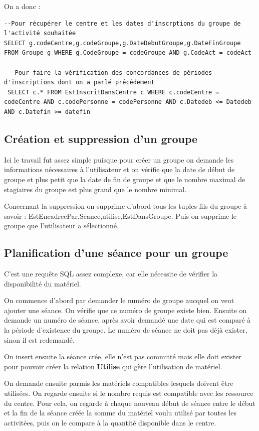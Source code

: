 \documentclass[10pt]{article}
\begin{document}
On a donc : 

 \begin{small}
\begin{verbatim}
--Pour récupérer le centre et les dates d'inscrptions du groupe de l'activité souhaitée
SELECT g.codeCentre,g.codeGroupe,g.DateDebutGroupe,g.DateFinGroupe FROM Groupe g WHERE g.CodeGroupe = codeGroupe AND g.CodeAct = codeAct

 --Pour faire la vérification des concordances de périodes d'inscriptions dont on a parlé précédement
 SELECT c.* FROM EstInscritDansCentre c WHERE c.codeCentre = codeCentre AND c.codePersonne = codePersonne AND c.Datedeb <= Datedeb AND c.Datefin >= datefin
\end{verbatim}
\end{small}

\subsection{Création et suppression d'un groupe}

Ici le travail fut assez simple puisque pour créer un groupe on demande les informations nécessaires à l'utilisateur et on vérifie que la date de début de groupe et plus petit que la date de fin de groupe et que le nombre maximal de stagiaires du groupe est plus grand que le nombre minimal. 

Concernant la suppression on supprime d'abord tous les tuples fils du groupe à savoir : EstEncadreePar,Seance,utilise,EstDansGroupe. Puis on supprime le groupe que l'utilisateur a sélectionné.
\subsection{Planification d'une séance pour un groupe}


C'est une requête SQL assez complexe, car elle nécessite de vérifier la disponibilité du matériel.

On commence d'abord par demander le numéro de groupe aucquel on veut ajouter une séance. On vérifie que ce numéro
de groupe existe bien. Ensuite on demande un numéro de séance, après avoir demandé une date qui est comparé à la
période d'existence du groupe. Le numéro de séance ne doit pas déjà exister, sinon il est redemandé.

On insert ensuite la séance crée, elle n'est pas committé mais elle doit exister pour pouvoir créer la relation
\textbf{Utilise} qui gère l'utilisation de matériel. 

On demande ensuite parmis les matériels compatibles lesquels doivent être utilisées. On regarde ensuite si le nombre requis est
compatible avec les ressource du centre. Pour cela, on regarde à chaque nouveau début de séance entre le début et la fin de la séance
créée la somme du matériel voulu utilisé par toutes les activitées, puis on le compare à la quantité disponible dans le centre.
\end{document}
